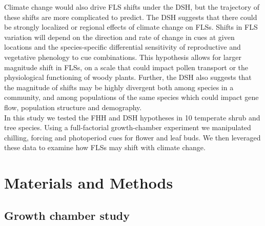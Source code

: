 \documentclass[12pt]{article}\usepackage[]{graphicx}\usepackage[]{color}
\begin{document}
\noindent Climate change would also drive FLS shifts under the DSH, but the trajectory of these shifts are more complicated to predict. The DSH suggests that there could be strongly localized or regional effects of climate change on FLSs. Shifts in FLS variation will depend on the direction and rate of change in cues at given locations and the species-specific differential sensitivity of reproductive and vegetative phenology to cue combinations. This hypothesis allows for larger magnitude shift in FLSs, on a scale that could impact pollen transport or the physiological functioning of woody plants. Further, the DSH also suggests that the magnitude of shifts may be highly divergent both among species in a community, and among populations of the same species which could impact gene flow, population structure and demography.\\

\noindent In this study we tested the FHH and DSH hypotheses in 10 temperate shrub and tree species. Using a full-factorial growth-chamber experiment we manipulated chilling, forcing and photoperiod cues for flower and leaf buds. We then leveraged these data to examine how FLSs may shift with climate change.\\ %

\section*{Materials and Methods}

\subsection*{Growth chamber study}
\end{document}
